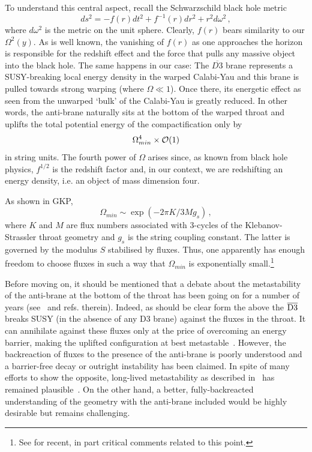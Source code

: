 \documentclass[12pt]{article}
\newcommand{\be}{\begin{equation}}
\newcommand{\ee}{\end{equation}}
\newcommand{\ol}{\overline}
\numberwithin{equation}{section}
\begin{document}
To understand this central aspect, recall the Schwarzschild black hole metric
\be
ds^2=-f(r)dt^2+f^{-1}(r)dr^2+r^2d\omega^2\,,
\ee
where $d\omega^2$ is the metric on the unit sphere. Clearly, $f(r)$ bears similarity to our $\Omega^2(y)$. As is well known, the vanishing of $f(r)$ as one approaches the horizon is responsible for the redshift effect and the force that pulls any massive object into the black hole. The same happens in our case: The $\overline{D3}$ brane represents a SUSY-breaking local energy density in the warped Calabi-Yau and this brane is pulled towards strong warping (where $\Omega\ll 1$). Once there, its energetic effect as seen from the unwarped `bulk' of the Calabi-Yau is greatly reduced. In other words, the anti-brane naturally sits at the bottom of the warped throat and uplifts the total potential energy of the compactification only by 
\be
\Omega_{min}^4\times {\cal O}(1)
\ee
in string units. The fourth power of $\Omega$ arises since, as known from black hole physics, $f^{1/2}$ is the redshift factor and, in our context, we are redshifting an energy density, i.e. an object of mass dimension four. 

As shown in GKP, 
\be
\Omega_{min}\sim \exp(-2\pi K/3M g_s)\,,\label{oks}
\ee
where $K$ and $M$ are flux numbers associated with 3-cycles of the Klebanov-Strassler throat geometry and $g_s$ is the string coupling constant. The latter is governed by the modulus $S$ stabilised by fluxes. Thus, one apparently has enough freedom to choose fluxes in such a way that $\Omega_{min}$ is exponentially small.\footnote{
See
\cite{Bena:2018fqc, Blumenhagen:2019qcg} for recent, in part critical comments related to this point.
} 

Before moving on, it should be mentioned that a debate about the metastability of the anti-brane at the bottom of the throat has been going on for a number of years (see~\cite{Bena:2014jaa, Michel:2014lva, Cohen-Maldonado:2015ssa, Polchinski:2015bea, Bena:2016fqp, Danielsson:2016cit} and refs. therein). Indeed, as should be clear form the above the $\ol{\rm D3}$  breaks SUSY (in the absence of any D3 brane) against the fluxes in the throat. It can annihilate against these fluxes only at the price of overcoming an energy barrier, making the uplifted configuration at best metastable~\cite{Kachru:2002gs}. However, the backreaction of fluxes to the presence of the anti-brane is poorly understood and a barrier-free decay or outright instability has been claimed. In spite of many efforts to show the opposite, long-lived metastability as described in~\cite{Kachru:2002gs} has remained plausible~\cite{Michel:2014lva, Polchinski:2015bea}. On the other hand, a better, fully-backreacted understanding of the geometry with the anti-brane included would be highly desirable but remains challenging.
\end{document}
